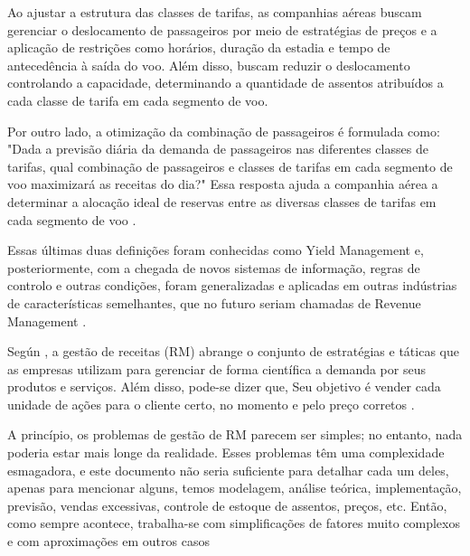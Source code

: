 Ao ajustar a estrutura das classes de tarifas, as companhias aéreas buscam gerenciar o deslocamento de passageiros por meio de estratégias de preços e a aplicação de restrições como horários, duração da estadia e tempo de antecedência à saída do voo. Além disso, buscam reduzir o deslocamento controlando a capacidade, determinando a quantidade de assentos atribuídos a cada classe de tarifa em cada segmento de voo.

Por outro lado, a otimização da combinação de passageiros é formulada como: "Dada a previsão diária da demanda de passageiros nas diferentes classes de tarifas, qual combinação de passageiros e classes de tarifas em cada segmento de voo maximizará as receitas do dia?" Essa resposta ajuda a companhia aérea a determinar a alocação ideal de reservas entre as diversas classes de tarifas em cada segmento de voo \cite{article_base}. 

Essas últimas duas definições foram conhecidas como Yield Management e, posteriormente, com a chegada de novos sistemas de informação, regras de controlo e outras condições, foram generalizadas e aplicadas em outras indústrias de características semelhantes, que no futuro seriam chamadas de Revenue Management \cite{article_YM_to_RM}.

Según \cite{article_Ryzin2014}, a gestão de receitas (RM) abrange o conjunto de estratégias e táticas que as empresas utilizam para gerenciar de forma científica a demanda por seus produtos e serviços. Além disso, pode-se dizer que, Seu objetivo é vender cada unidade de ações para o cliente certo, no momento e pelo preço corretos \cite{doi:10.1080/02642069.2010.491543}.

A princípio, os problemas de gestão de RM parecem ser simples; no entanto, nada poderia estar mais longe da realidade. Esses problemas têm uma complexidade esmagadora, e este documento não seria suficiente para detalhar cada um deles, apenas para mencionar alguns, temos modelagem, análise teórica, implementação, previsão, vendas excessivas, controle de estoque de assentos, preços, etc. Então, como sempre acontece, trabalha-se com simplificações de fatores muito complexos e com aproximações em outros casos \cite{doi:10.1287/trsc.33.2.233}